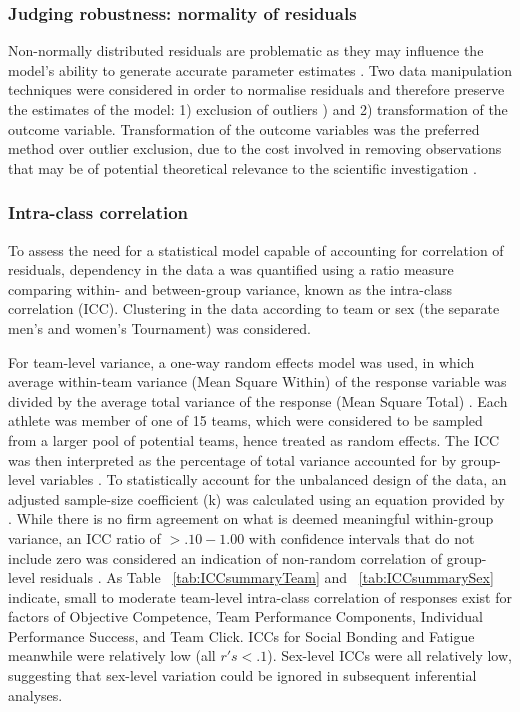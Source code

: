 \begin{CJK}{UTF8}{gbsn}
\subsubsection{Judging robustness: normality of residuals\label{app8:normality}}
Non-normally distributed residuals are problematic as they may influence the model's ability to generate accurate parameter estimates . Two data manipulation techniques were considered in order to normalise residuals and therefore preserve the estimates of the model: 1) exclusion of outliers \citep[according to Tukey's method; observations above and below 1.5x the Inter Quartile Range (IQR); see][]{Tukey1977}) and 2) transformation of the outcome variable.  Transformation of the outcome variables was the preferred method over outlier exclusion, due to the cost involved in removing observations that may be of potential theoretical relevance to the scientific investigation \citep{Rousseeuw2011}.

\subsubsection{Intra-class correlation\label{app8:ICC}}
To assess the need for a statistical model capable of accounting for correlation of residuals, dependency in the data a was quantified using a ratio measure comparing within- and between-group variance, known as the intra-class correlation (ICC). Clustering in the data according to team or sex (the separate men's and women's Tournament) was considered.

For team-level variance, a one-way random effects model was used, in which average within-team variance (Mean Square Within) of the response variable was divided by the average total variance of the response (Mean Square Total) \citep{Field2005a}.  Each athlete was member of one of 15 teams, which were considered to be sampled from a larger pool of potential teams, hence treated as random effects. The ICC was then interpreted as the percentage of total variance accounted for by group-level variables \citep{Wolak2012}.
To statistically account for the unbalanced design of the data, an adjusted sample-size coefficient (k) was calculated using an equation provided by \citep{Lessells1987}.  While there is no firm agreement on what is deemed meaningful within-group variance, an ICC ratio of $>.10-1.00$ with confidence intervals that do not include zero was considered an indication of non-random correlation of group-level residuals \citep{Bailey2011}. As Table ~\ref{tab:ICCsummaryTeam} and ~\ref{tab:ICCsummarySex} indicate, small to moderate team-level intra-class correlation of responses exist for factors of Objective Competence, Team Performance Components, Individual Performance Success, and Team Click.  ICCs for Social Bonding and Fatigue meanwhile were relatively low (all $r's <.1$). Sex-level ICCs were all relatively low, suggesting that sex-level variation could be ignored in subsequent inferential analyses.\\


\end{CJK}

